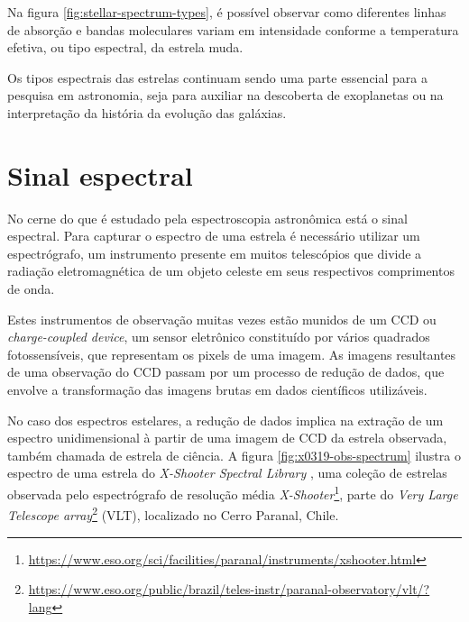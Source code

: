 Na figura \ref{fig:stellar-spectrum-types}, é possível observar como diferentes linhas de absorção e bandas moleculares variam em intensidade conforme a temperatura efetiva, ou tipo espectral, da estrela muda.

Os tipos espectrais das estrelas continuam sendo uma parte essencial para a pesquisa em astronomia, seja para auxiliar na descoberta de exoplanetas ou na interpretação da história da evolução das galáxias. 

\section{Sinal espectral}



No cerne do que é estudado pela espectroscopia astronômica está o sinal espectral. Para capturar o espectro de uma estrela é necessário utilizar um espectrógrafo, um instrumento presente em muitos telescópios que divide a radiação eletromagnética de um objeto celeste em seus respectivos comprimentos de onda.

Estes instrumentos de observação muitas vezes estão munidos de um CCD ou \textit{charge-coupled device}, um sensor eletrônico constituído por vários quadrados fotossensíveis, que representam os pixels de uma imagem. As imagens resultantes de uma observação do CCD passam por um processo de redução de dados, que envolve a transformação das imagens brutas em dados científicos utilizáveis.   

No caso dos espectros estelares, a redução de dados implica na extração de um espectro unidimensional à partir de uma imagem de CCD da estrela observada, também chamada de estrela de ciência. A figura \ref{fig:x0319-obs-spectrum} ilustra o espectro de uma estrela do \textit{X-Shooter Spectral Library} \citep{Chen2014TheXS}, uma coleção de estrelas observada pelo espectrógrafo de resolução média \textit{X-Shooter}\footnote{\url{https://www.eso.org/sci/facilities/paranal/instruments/xshooter.html}}, parte do \textit{Very Large Telescope array}\footnote{\url{https://www.eso.org/public/brazil/teles-instr/paranal-observatory/vlt/?lang}} (VLT), localizado no Cerro Paranal, Chile.  

